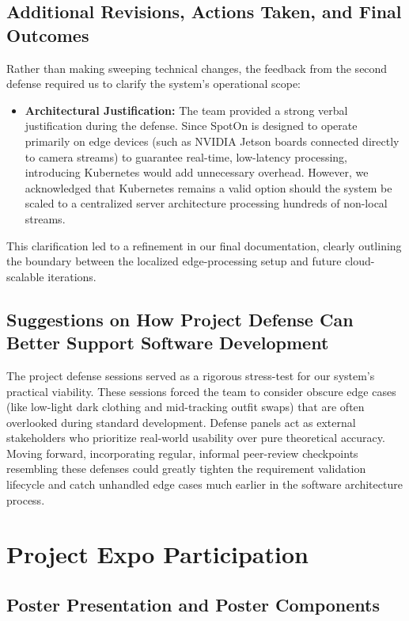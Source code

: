 \subsection{Additional Revisions, Actions Taken, and Final Outcomes}
Rather than making sweeping technical changes, the feedback from the second defense required us to clarify the system's operational scope:
\begin{itemize}
    \item \textbf{Architectural Justification:} The team provided a strong verbal justification during the defense. Since SpotOn is designed to operate primarily on edge devices (such as NVIDIA Jetson boards connected directly to camera streams) to guarantee real-time, low-latency processing, introducing Kubernetes would add unnecessary overhead. However, we acknowledged that Kubernetes remains a valid option should the system be scaled to a centralized server architecture processing hundreds of non-local streams. 
\end{itemize}
This clarification led to a refinement in our final documentation, clearly outlining the boundary between the localized edge-processing setup and future cloud-scalable iterations.

\subsection{Suggestions on How Project Defense Can Better Support Software Development}
The project defense sessions served as a rigorous stress-test for our system’s practical viability. These sessions forced the team to consider obscure edge cases (like low-light dark clothing and mid-tracking outfit swaps) that are often overlooked during standard development. Defense panels act as external stakeholders who prioritize real-world usability over pure theoretical accuracy. Moving forward, incorporating regular, informal peer-review checkpoints resembling these defenses could greatly tighten the requirement validation lifecycle and catch unhandled edge cases much earlier in the software architecture process.

\section{Project Expo Participation}

\subsection{Poster Presentation and Poster Components}

